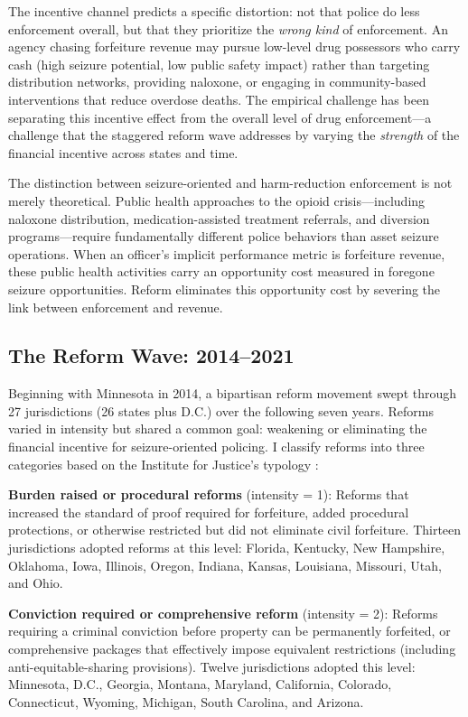 \documentclass[12pt]{article}
\begin{document}
The incentive channel predicts a specific distortion: not that police do less enforcement overall, but that they prioritize the \emph{wrong kind} of enforcement. An agency chasing forfeiture revenue may pursue low-level drug possessors who carry cash (high seizure potential, low public safety impact) rather than targeting distribution networks, providing naloxone, or engaging in community-based interventions that reduce overdose deaths. The empirical challenge has been separating this incentive effect from the overall level of drug enforcement---a challenge that the staggered reform wave addresses by varying the \emph{strength} of the financial incentive across states and time.

The distinction between seizure-oriented and harm-reduction enforcement is not merely theoretical. Public health approaches to the opioid crisis---including naloxone distribution, medication-assisted treatment referrals, and diversion programs---require fundamentally different police behaviors than asset seizure operations. When an officer's implicit performance metric is forfeiture revenue, these public health activities carry an opportunity cost measured in foregone seizure opportunities. Reform eliminates this opportunity cost by severing the link between enforcement and revenue.

\subsection{The Reform Wave: 2014--2021}

Beginning with Minnesota in 2014, a bipartisan reform movement swept through 27 jurisdictions (26 states plus D.C.) over the following seven years. Reforms varied in intensity but shared a common goal: weakening or eliminating the financial incentive for seizure-oriented policing. I classify reforms into three categories based on the Institute for Justice's typology \citep{ij2020policing, carpenter2019asset}:

\textbf{Burden raised or procedural reforms} (intensity = 1): Reforms that increased the standard of proof required for forfeiture, added procedural protections, or otherwise restricted but did not eliminate civil forfeiture. Thirteen jurisdictions adopted reforms at this level: Florida, Kentucky, New Hampshire, Oklahoma, Iowa, Illinois, Oregon, Indiana, Kansas, Louisiana, Missouri, Utah, and Ohio.

\textbf{Conviction required or comprehensive reform} (intensity = 2): Reforms requiring a criminal conviction before property can be permanently forfeited, or comprehensive packages that effectively impose equivalent restrictions (including anti-equitable-sharing provisions). Twelve jurisdictions adopted this level: Minnesota, D.C., Georgia, Montana, Maryland, California, Colorado, Connecticut, Wyoming, Michigan, South Carolina, and Arizona.
\end{document}
